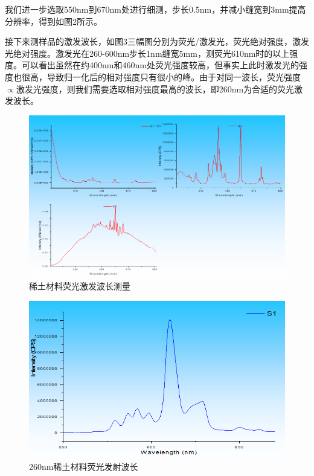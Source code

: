 \documentclass{article}
\begin{document}
我们进一步选取550nm到670nm处进行细测，步长0.5nm，并减小缝宽到3mm提高分辨率，得到如图2所示。
	
	
	接下来测样品的激发波长，如图3三幅图分别为荧光/激发光，荧光绝对强度，激发光绝对强度。激发光在260-600nm步长1nm缝宽5mm，测荧光610nm时的以上强度。可以看出虽然在约400nm和460nm处荧光强度较高，但事实上此时激发光的强度也很高，导致归一化后的相对强度只有很小的峰。由于对同一波长，荧光强度$ \propto $激发光强度，则我们需要选取相对强度最高的波长，即260nm为合适的荧光激发波长。
		\begin{figure}[!h]
		\centering
		\includegraphics[scale=0.8]{EX1}
		\caption{\heiti{}稀土材料荧光激发波长测量}
		
	\end{figure}


	\begin{figure}[!h]
	\centering
	\includegraphics[scale=0.8]{3}
	\caption{\heiti{}260nm稀土材料荧光发射波长}
	
\end{figure}
\end{document}
